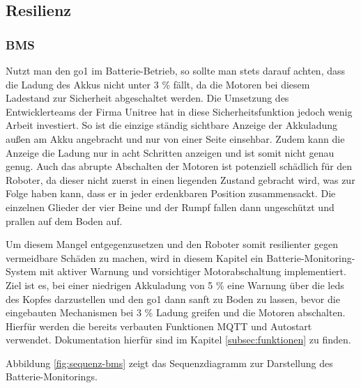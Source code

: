 \subsection{Resilienz}
\label{subsec:resilienz}

\subsubsection{BMS}
\label{subsubsec:bms-monitor}

Nutzt man den \gls{go1} im Batterie-Betrieb, so sollte man stets darauf achten, dass die Ladung des Akkus nicht unter
\num{3} \% fällt, da die Motoren bei diesem Ladestand zur Sicherheit abgeschaltet werden.
Die Umsetzung des Entwicklerteams der Firma Unitree hat in diese Sicherheitsfunktion jedoch wenig Arbeit investiert.
So ist die einzige ständig sichtbare Anzeige der Akkuladung außen am Akku angebracht und nur von einer Seite einsehbar.
Zudem kann die Anzeige die Ladung nur in acht Schritten anzeigen und ist somit nicht genau genug.
Auch das abrupte Abschalten der Motoren ist potenziell schädlich für den Roboter, da dieser nicht zuerst in einen liegenden
Zustand gebracht wird, was zur Folge haben kann, dass er in jeder erdenkbaren Position zusammensackt.
Die einzelnen Glieder der vier Beine und der Rumpf fallen dann ungeschützt und prallen auf dem Boden auf.

Um diesem Mangel entgegenzusetzen und den Roboter somit resilienter gegen vermeidbare Schäden zu machen, wird in diesem
Kapitel ein Batterie-Monitoring-System mit aktiver Warnung und vorsichtiger Motorabschaltung implementiert.
Ziel ist es, bei einer niedrigen Akkuladung von \num{5} \% eine Warnung über die \glspl{led} des Kopfes darzustellen und den
\gls{go1} dann sanft zu Boden zu lassen, bevor die eingebauten Mechanismen bei \num{3} \% Ladung greifen und die Motoren
abschalten.
Hierfür werden die bereits verbauten Funktionen MQTT und Autostart verwendet.
Dokumentation hierfür sind im Kapitel \ref{subsec:funktionen} zu finden.


Abbildung \ref{fig:sequenz-bms} zeigt das Sequenzdiagramm zur Darstellung des Batterie-Monitorings.

